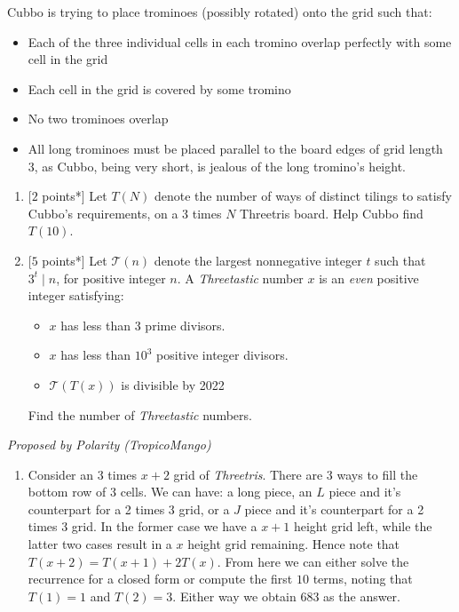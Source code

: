 \begin{enumerate}[align=left,start=1,label=\textbf{\textcolor{meablue}{Problem \arabic*}}]
        Cubbo is trying to place trominoes (possibly rotated) onto the grid such that:
        \begin {itemize}
        \item Each of the three individual cells in each tromino overlap perfectly with some cell in the grid
        \item Each cell in the grid is covered by some tromino
        \item No two trominoes overlap
        \item All long trominoes must be placed parallel to the board edges of grid length 3, as Cubbo, being very short, is jealous of the long tromino's height.
        \end {itemize}
        
    \begin{enumerate}
        \item {[$2$ points*]} Let $T(N)$ denote the number of ways of distinct tilings to satisfy Cubbo's requirements, on a 3 times $N$ Threetris board. Help Cubbo find $T(10)$.
        \item {[$5$ points*]} Let $\mathcal{T}(n)$ denote the largest nonnegative integer $t$ such that $3^t \mid n$, for positive integer $n$. A \emph{Threetastic} number $x$ is an \emph{even} positive integer satisfying:
        \begin{itemize}
            \item $x$ has less than 3 prime divisors. 
            \item $x$ has less than $10^3$ positive integer divisors. 
            \item $\mathcal{T}(T(x))$ is divisible by 2022
        \end{itemize}
        
        Find the number of \emph{Threetastic} numbers.
    \end{enumerate}

    \textrm{\emph{Proposed by Polarity (TropicoMango)}}

    \begin{solution}
        \begin{enumerate}
            \item Consider an 3 times $x + 2$ grid of \emph{Threetris}. There are 3 ways to fill the bottom row of 3 cells. We can have: a long piece, an $L$ piece and it's counterpart for a 2 times 3 grid, or a $J$ piece and it's counterpart for a 2 times 3 grid. In the former case we have a $x + 1$ height grid left, while the latter two cases result in a $x$ height grid remaining. Hence note that $T(x + 2) = T(x + 1) + 2 T(x)$. From here we can either solve the recurrence for a closed form or compute the first $10$ terms, noting that $T(1) = 1$ and $T(2) = 3$. Either way we obtain 683 as the answer. 
            

\end{enumerate}
\end{solution}
\end{enumerate}
